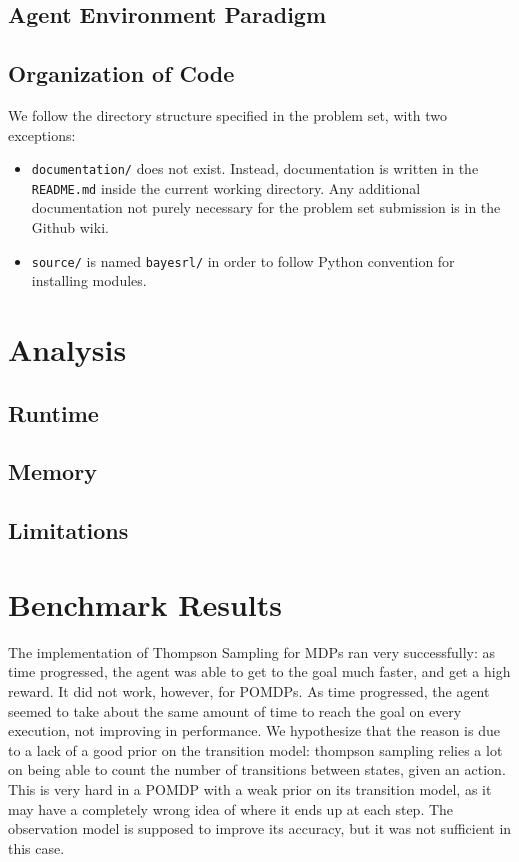 \documentclass{pset}
\begin{document}
\subsection{Agent Environment Paradigm}

\subsection{Organization of Code}
We follow the directory structure specified in the problem set, with two
exceptions:
\begin{itemize}
\item \texttt{documentation/} does not exist. Instead, documentation is written
in the \texttt{README.md} inside the current working directory. Any additional
documentation not purely necessary for the problem set submission is in the
Github wiki.
\item \texttt{source/} is named \texttt{bayesrl/} in order to follow Python
convention for installing modules.
\end{itemize}

\section{Analysis}

\subsection{Runtime}

\subsection{Memory}

\subsection{Limitations}

\section{Benchmark Results}
The implementation of Thompson Sampling for MDPs ran very successfully: as time
progressed, the agent was able to get to the goal much faster, and get a high
reward. It did not work, however, for POMDPs. As time progressed, the agent seemed
to take about the same amount of time to reach the goal on every execution, not
improving in performance. We hypothesize that the reason is due to a lack of
a good prior on the transition model: thompson sampling relies a lot on being
able to count the number of transitions between states, given an action. This
is very hard in a POMDP with a weak prior on its transition model, as it may have
a completely wrong idea of where it ends up at each step. The observation model
is supposed to improve its accuracy, but it was not sufficient in this case.
\end{document}
